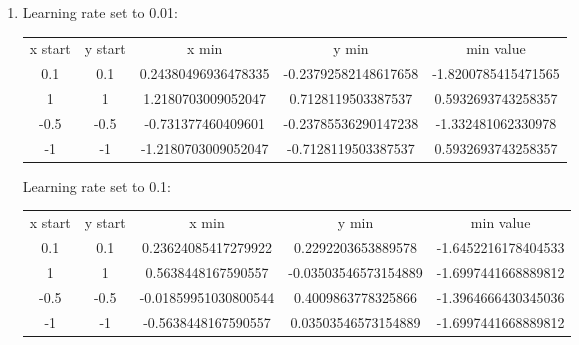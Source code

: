 \documentclass{article}
\begin{document}
\begin{enumerate}
\begin{enumerate}[label=(\alph*)]
            \item Learning rate set to 0.01:\\
                \begin{tabular}{ c c c c c }
                    x start & y start & x min & y min & min value\\
                    0.1 & 0.1 & 0.24380496936478335 & -0.23792582148617658 & -1.8200785415471565\\
                    1 & 1 & 1.2180703009052047 & 0.7128119503387537 & 0.5932693743258357\\
                    -0.5 & -0.5 & -0.731377460409601 & -0.23785536290147238 & -1.332481062330978\\
                    -1 & -1 & -1.2180703009052047 & -0.7128119503387537 & 0.5932693743258357\\
                \end{tabular}

                Learning rate set to 0.1:\\
            \begin{tabular}{c c c c c}
                x start & y start & x min & y min & min value\\
                0.1 & 0.1 & 0.23624085417279922 & 0.2292203653889578 & -1.6452216178404533\\
                1 & 1 & 0.5638448167590557 & -0.03503546573154889 & -1.6997441668889812\\
                -0.5 & -0.5 & -0.01859951030800544 & 0.4009863778325866 & -1.3964666430345036\\
                -1 & -1 & -0.5638448167590557 & 0.03503546573154889 & -1.6997441668889812\\
            \end{tabular}
        \end{enumerate}


\end{enumerate}
\end{document}
